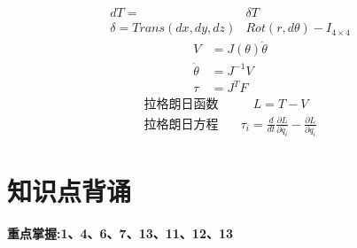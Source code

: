 \documentclass[12pt, a4paper, oneside]{ctexbook}
\begin{document}
\begin{align}
	dT=&\delta T\\
	\delta = Trans(dx,dy,dz)&Rot(r,d\theta)-I_{4\times4}
\end{align}
\begin{align}
	V&=J(\theta)\dot{\theta}\\
	\dot{\theta}&=J^{-1}V\\
	\tau&=J^T F
\end{align}
\begin{align}
	\mbox{拉格朗日函数} &\qquad L=T-V\\
	\mbox{拉格朗日方程} &\quad \tau_i=\frac{d}{dt}\frac{\partial L}{\partial \dot{q_i}}-\frac{\partial L}{\partial q_i}
\end{align}

\section{知识点背诵}
\begin{center}
	\textbf{重点掌握:1、4、6、7、13、11、12、13}
\end{center}
\end{document}
